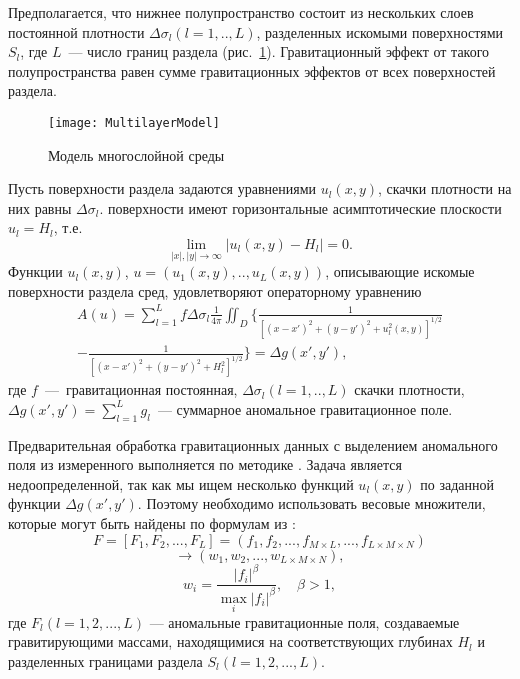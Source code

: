 Предполагается, что нижнее полупространство состоит из нескольких слоев постоянной плотности $\Delta\sigma_l(l=1,..,L)$, разделенных искомыми поверхностями $S_l$, где $L$~--- число границ раздела (рис.~\ref{fig:multlayer}). Гравитационный эффект от такого полупространства равен сумме гравитационных эффектов от всех поверхностей раздела.
\begin{figure}[h]
	\centering
	\texttt{[image: MultilayerModel]}
	\caption{Модель многослойной среды}
	\label{fig:multlayer}
\end{figure}
Пусть поверхности раздела задаются уравнениями $u_l(x,y)$, скачки плотности на них равны $\Delta\sigma_l$. поверхности имеют горизонтальные асимптотические плоскости $u_l=H_l$, т.е. $$\lim_{|x|,|y|\to\infty}|u_l(x,y)-H_l|=0.$$ Функции $u_l(x,y)$, $u=(u_1(x,y), .., u_L(x,y))$, описывающие искомые поверхности раздела сред, удовлетворяют операторному уравнению
\begin{equation}\label{equ_grav}
\begin{aligned}
A(u)=\sum_{l=1}^{L}f\Delta\sigma_l\frac{1}{4\pi}\iint_D\bigg\{\frac{1}{[(x-x')^2+(y-y')^2+u_l^2(x,y)]^{1/2}} \\
-\frac{1}{[(x-x')^2+(y-y')^2+H_l^2]^{1/2}}\bigg\}=\Delta g(x',y'),
\end{aligned}
\end{equation}
где $f$~---~гравитационная постоянная, $\Delta\sigma_l(l=1,..,L)$ скачки плотности, $\Delta g(x',y')=\sum_{l=1}^{L}g_l$~--- суммарное аномальное гравитационное поле. 

Предварительная обработка гравитационных данных с выделением аномального поля из измеренного выполняется по методике  \cite{MarPrut2003}. Задача является недоопределенной, так как мы ищем несколько функций $u_l(x,y)$ по заданной функции $\Delta g(x',y')$. Поэтому необходимо использовать весовые множители, которые могут быть найдены по формулам из \cite{AkMarMis2013}:
$$F=[F_1, F_2, ..., F_L]=(f_1, f_2, ..., f_{M\times L}, ..., f_{L\times M\times N})$$
$$\to (w_1, w_2, ..., w_{L\times M\times N}),$$
\begin{equation}\label{weght_fact_formula}
w_i=\frac{|f_i|^\beta}{\max\limits_{i} |f_i|^\beta}, \quad \beta>1,
\end{equation}
где $F_l (l=1, 2, ..., L)$ --- аномальные гравитационные поля, создаваемые гравитирующими массами, находящимися на соответствующих глубинах $H_l$ и разделенных границами раздела $S_l(l=1, 2, ..., L)$.

